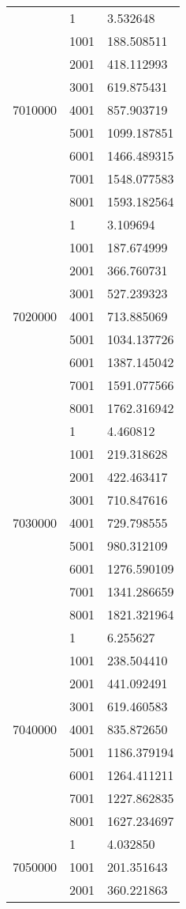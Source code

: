 \begin{table}[htb!]
\begin{tabular}{lll}
\multirow[c]{9}{*}{7010000} & 1 & 3.532648 \\
 & 1001 & 188.508511 \\
 & 2001 & 418.112993 \\
 & 3001 & 619.875431 \\
 & 4001 & 857.903719 \\
 & 5001 & 1099.187851 \\
 & 6001 & 1466.489315 \\
 & 7001 & 1548.077583 \\
 & 8001 & 1593.182564 \\
\multirow[c]{9}{*}{7020000} & 1 & 3.109694 \\
 & 1001 & 187.674999 \\
 & 2001 & 366.760731 \\
 & 3001 & 527.239323 \\
 & 4001 & 713.885069 \\
 & 5001 & 1034.137726 \\
 & 6001 & 1387.145042 \\
 & 7001 & 1591.077566 \\
 & 8001 & 1762.316942 \\
\multirow[c]{9}{*}{7030000} & 1 & 4.460812 \\
 & 1001 & 219.318628 \\
 & 2001 & 422.463417 \\
 & 3001 & 710.847616 \\
 & 4001 & 729.798555 \\
 & 5001 & 980.312109 \\
 & 6001 & 1276.590109 \\
 & 7001 & 1341.286659 \\
 & 8001 & 1821.321964 \\
\multirow[c]{9}{*}{7040000} & 1 & 6.255627 \\
 & 1001 & 238.504410 \\
 & 2001 & 441.092491 \\
 & 3001 & 619.460583 \\
 & 4001 & 835.872650 \\
 & 5001 & 1186.379194 \\
 & 6001 & 1264.411211 \\
 & 7001 & 1227.862835 \\
 & 8001 & 1627.234697 \\
\multirow[c]{9}{*}{7050000} & 1 & 4.032850 \\
 & 1001 & 201.351643 \\
 & 2001 & 360.221863 \\

\end{tabular}
\end{table}
